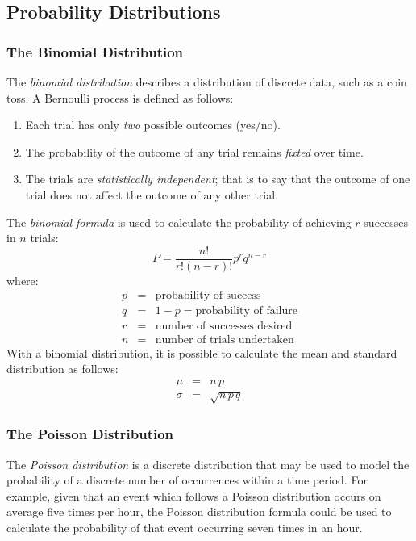 \documentclass[12pt]{article}
\begin{document}
\subsection{Probability Distributions}
\subsubsection{The Binomial Distribution}
The \textit{binomial distribution} describes a distribution of discrete data, such as a coin toss. A Bernoulli process is defined as follows:
\begin{enumerate}
\item Each trial has only \textit{two} possible outcomes (yes/no).
\item The probability of the outcome of any trial remains \textit{fixted} over time.
\item The trials are \textit{statistically independent}; that is to say that the outcome of one trial does not affect the outcome of any other trial.
\end{enumerate}
The \textit{binomial formula} is used to calculate the probability of achieving $r$ successes in $n$ trials:
\begin{equation}
P = \frac{n!}{r!(n-r)!}p^{r}q^{n-r}
\end{equation}
where:
\begin{eqnarray}
p & = & \textrm{probability of success} \nonumber \\
q & = & 1-p = \textrm{probability of failure} \nonumber \\
r & = & \textrm{number of successes desired} \nonumber \\
n & = & \textrm{number of trials undertaken} \nonumber 
\end{eqnarray}
With a binomial distribution, it is possible to calculate the mean and standard distribution as follows:
\begin{eqnarray}
\mu & = & n\,p \\
\sigma & = &\sqrt{n\,p\,q}
\end{eqnarray}

\subsubsection{The Poisson Distribution}

The \textit{Poisson distribution} is a discrete distribution that may be used to model the probability of a discrete number of occurrences within a time period. For example, given that an event which follows a Poisson distribution occurs on average five times per hour, the Poisson distribution formula could be used to calculate the probability of that event occurring seven times in an hour. 
\end{document}
